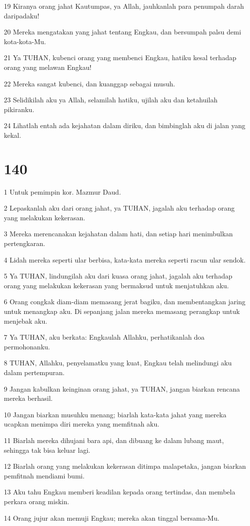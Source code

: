 \par 19 Kiranya orang jahat Kautumpas, ya Allah, jauhkanlah para penumpah darah daripadaku!
\par 20 Mereka mengatakan yang jahat tentang Engkau, dan bersumpah palsu demi kota-kota-Mu.
\par 21 Ya TUHAN, kubenci orang yang membenci Engkau, hatiku kesal terhadap orang yang melawan Engkau!
\par 22 Mereka sangat kubenci, dan kuanggap sebagai musuh.
\par 23 Selidikilah aku ya Allah, selamilah hatiku, ujilah aku dan ketahuilah pikiranku.
\par 24 Lihatlah entah ada kejahatan dalam diriku, dan bimbinglah aku di jalan yang kekal.

\chapter{140}

\par 1 Untuk pemimpin kor. Mazmur Daud.
\par 2 Lepaskanlah aku dari orang jahat, ya TUHAN, jagalah aku terhadap orang yang melakukan kekerasan.
\par 3 Mereka merencanakan kejahatan dalam hati, dan setiap hari menimbulkan pertengkaran.
\par 4 Lidah mereka seperti ular berbisa, kata-kata mereka seperti racun ular sendok.
\par 5 Ya TUHAN, lindungilah aku dari kuasa orang jahat, jagalah aku terhadap orang yang melakukan kekerasan yang bermaksud untuk menjatuhkan aku.
\par 6 Orang congkak diam-diam memasang jerat bagiku, dan membentangkan jaring untuk menangkap aku. Di sepanjang jalan mereka memasang perangkap untuk menjebak aku.
\par 7 Ya TUHAN, aku berkata: Engkaulah Allahku, perhatikanlah doa permohonanku.
\par 8 TUHAN, Allahku, penyelamatku yang kuat, Engkau telah melindungi aku dalam pertempuran.
\par 9 Jangan kabulkan keinginan orang jahat, ya TUHAN, jangan biarkan rencana mereka berhasil.
\par 10 Jangan biarkan musuhku menang; biarlah kata-kata jahat yang mereka ucapkan menimpa diri mereka yang memfitnah aku.
\par 11 Biarlah mereka dihujani bara api, dan dibuang ke dalam lubang maut, sehingga tak bisa keluar lagi.
\par 12 Biarlah orang yang melakukan kekerasan ditimpa malapetaka, jangan biarkan pemfitnah mendiami bumi.
\par 13 Aku tahu Engkau memberi keadilan kepada orang tertindas, dan membela perkara orang miskin.
\par 14 Orang jujur akan memuji Engkau; mereka akan tinggal bersama-Mu.

